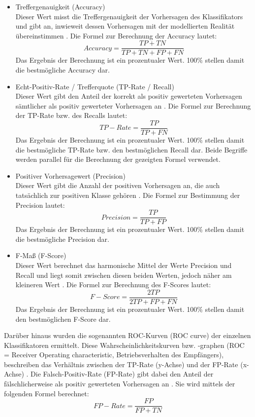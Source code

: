 \begin{itemize}
\item Treffergenauigkeit (Accuracy)
\\Dieser Wert misst die Treffergenauigkeit der Vorhersagen des Klassifikators und gibt an, inwieweit dessen Vorhersagen mit der modellierten Realität übereinstimmen \cite{Sammut2017}. Die Formel zur Berechnung der Accuracy lautet:
\\\[Accuracy = \frac{TP+TN}{TP+TN+FP+FN}\]
Das Ergebnis der Berechnung ist ein prozentualer Wert. 100\% stellen damit die bestmögliche Accuracy dar.
\item Echt-Positiv-Rate / Trefferquote (TP-Rate / Recall)
\\Dieser Wert gibt den Anteil der korrekt als positiv gewerteten Vorhersagen sämtlicher als positiv gewerteter Vorhersagen an \cite{Alpaydin2010}. Die Formel zur Berechnung der TP-Rate bzw. des Recalls lautet:
\\\[TP-Rate = \frac{TP}{TP+FN}\]
Das Ergebnis der Berechnung ist ein prozentualer Wert. 100\% stellen damit die bestmögliche TP-Rate bzw. den bestmöglichen Recall dar. Beide Begriffe werden parallel für die Berechnung der gezeigten Formel verwendet.
\item Positiver Vorhersagewert (Precision)
\\ Dieser Wert gibt die Anzahl der positiven Vorhersagen an, die auch tatsächlich zur positiven Klasse gehören \cite{Sammut2017}. Die Formel zur Bestimmung der Precision lautet:
\\\[Precision = \frac{TP}{TP+FP}\]
Das Ergebnis der Berechnung ist ein prozentualer Wert. 100\% stellen damit die bestmögliche Precision dar.
\item F-Maß (F-Score)
\\ Dieser Wert berechnet das harmonische Mittel der Werte Precision und Recall und liegt somit zwischen diesen beiden Werten, jedoch näher am kleineren Wert \cite{Sammut2017}. Die Formel zur Berechnung des F-Scores lautet:
\\\[F-Score = \frac{2TP}{2TP+FP+FN}\]
Das Ergebnis der Berechnung ist ein prozentualer Wert. 100\% stellen damit den bestmöglichen F-Score dar.
\end{itemize}

\label{roc-def}
Darüber hinaus wurden die sogenannten ROC-Kurven (ROC curve) der einzelnen Klassifikatoren ermittelt. Diese Wahrscheinlichkeitskurven bzw. -graphen (ROC = Receiver Operating characteristic, Betriebsverhalten des Empfängers), beschreiben das Verhältnis zwischen der TP-Rate (y-Achse) und der FP-Rate (x-Achse) \cite{Sammut2017,Narkhede2018}. Die Falsch-Positiv-Rate (FP-Rate) gibt dabei den Anteil der fälschlicherweise als positiv gewerteten Vorhersagen an \cite{Alpaydin2010}. Sie wird mittels der folgenden Formel berechnet:
\\\[FP-Rate = \frac{FP}{FP+TN}\]

